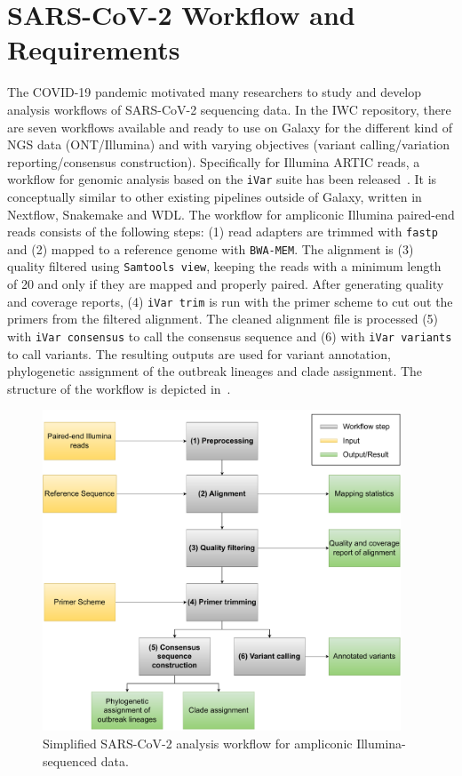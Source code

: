 \section{SARS-CoV-2 Workflow and Requirements}
The \ac{COVID-19} pandemic motivated many researchers to study and develop analysis workflows of \ac{SARS-CoV-2} sequencing data. In the \ac{IWC} repository, there are seven workflows available and ready to use on Galaxy for the different kind of NGS data (ONT/Illumina) and with varying objectives (variant calling/variation reporting/consensus construction). Specifically for Illumina ARTIC reads, a workflow for genomic analysis based on the \texttt{iVar} suite has been released~\cite{iwc2021covidivar}. It is conceptually similar to other existing pipelines outside of Galaxy, written in Nextflow, Snakemake and \ac{WDL}. The workflow for ampliconic Illumina paired-end reads consists of the following steps: (1) read adapters are trimmed with \texttt{fastp} and (2) mapped to a reference genome with \texttt{BWA-MEM}. The alignment is (3) quality filtered using \texttt{Samtools view}, keeping the reads with a minimum length of 20 and only if they are mapped and properly paired. After generating quality and coverage reports, (4) \texttt{iVar trim} is run with the primer scheme to cut out the primers from the filtered alignment. The cleaned alignment file is processed (5) with \texttt{iVar consensus} to call the consensus sequence and (6) with \texttt{iVar variants} to call variants. The resulting outputs are used for variant annotation, phylogenetic assignment of the outbreak lineages and clade assignment. The structure of the workflow is depicted in~. 

\begin{figure}[h!]
	\includegraphics[width=0.95\textwidth]{media/3-sars-cov-2.pdf}
	\caption{Simplified SARS-CoV-2 analysis workflow for ampliconic Illumina-sequenced data.}
	\label{fig:3-sars-wf}
\end{figure}

